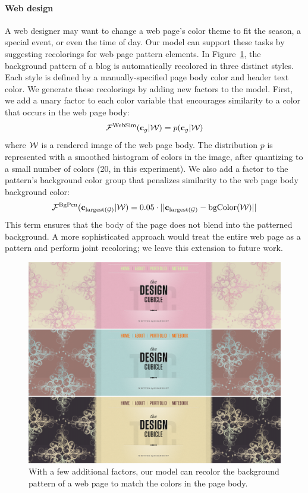 \paragraph{Web design}
A web designer may want to change a web page's color theme to fit the season, a special event, or even the time of day. Our model can support these tasks by suggesting recolorings for web page pattern elements. In Figure~\ref{fig:webpageRecoloring}, the background pattern of a blog is automatically recolored in three distinct styles. Each style is defined by a manually-specified page body color and header text color. We generate these recolorings by adding new factors to the model. First, we add a unary factor to each color variable that encourages similarity to a color that occurs in the web page body:
\begin{equation*}
\mathcal{F}^\textrm{WebSim}(\mathbf{c}_g | \mathcal{W}) = p(\mathbf{c}_g | \mathcal{W})
\end{equation*}
where $\mathcal{W}$ is a rendered image of the web page body. The distribution $p$ is represented with a smoothed histogram of colors in the image, after quantizing to a small number of colors (20, in this experiment).
We also add a factor to the pattern's background color group that penalizes similarity to the web page body background color:
\begin{equation*}
\mathcal{F}^\textrm{BgPen}(\mathbf{c}_{\textrm{largest}(\mathcal{G})} | \mathcal{W}) = 0.05 \cdot || \mathbf{c}_{\textrm{largest}(\mathcal{G})} - \textrm{bgColor}(\mathcal{W}) ||
\end{equation*}
This term ensures that the body of the page does not blend into the patterned background. A more sophisticated approach would treat the entire web page as a pattern and perform joint recoloring; we leave this extension to future work.


\begin{figure}[t]
\centering
\includegraphics[width=\columnwidth]{figs/webpageRecoloring}
\caption{With a few additional factors, our model can recolor the background pattern of a web page to match the colors in the page body.}
\label{fig:webpageRecoloring}
\vspace{-1.0em}
\end{figure}

